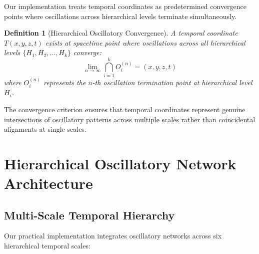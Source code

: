 \documentclass[12pt,a4paper]{article}
\newtheorem{definition}{Definition}
\begin{document}
Our implementation treats temporal coordinates as predetermined convergence points where oscillations across hierarchical levels terminate simultaneously.

\begin{definition}[Hierarchical Oscillatory Convergence]
A temporal coordinate $T(x,y,z,t)$ exists at spacetime point where oscillations across all hierarchical levels $\{H_1, H_2, \ldots, H_k\}$ converge:
$$\lim_{n \to \infty} \bigcap_{i=1}^{k} O_i^{(n)} = (x,y,z,t)$$
where $O_i^{(n)}$ represents the $n$-th oscillation termination point at hierarchical level $H_i$.
\end{definition}

The convergence criterion ensures that temporal coordinates represent genuine intersections of oscillatory patterns across multiple scales rather than coincidental alignments at single scales.

\section{Hierarchical Oscillatory Network Architecture}

\subsection{Multi-Scale Temporal Hierarchy}

Our practical implementation integrates oscillatory networks across six hierarchical temporal scales:
\end{document}
